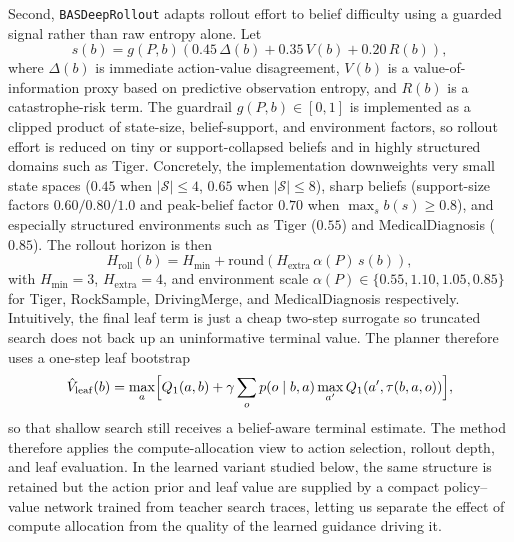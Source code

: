 \documentclass[10pt,twocolumn]{article}
\begin{document}
Second, \texttt{BASDeepRollout} adapts rollout effort to belief difficulty using a guarded signal rather than raw entropy alone. Let
\begin{equation}
s(b)=g(P,b)\left(0.45\,\Delta(b)+0.35\,V(b)+0.20\,R(b)\right),
\end{equation}
where $\Delta(b)$ is immediate action-value disagreement, $V(b)$ is a value-of-information proxy based on predictive observation entropy, and $R(b)$ is a catastrophe-risk term. The guardrail $g(P,b)\in[0,1]$ is implemented as a clipped product of state-size, belief-support, and environment factors, so rollout effort is reduced on tiny or support-collapsed beliefs and in highly structured domains such as Tiger. Concretely, the implementation downweights very small state spaces ($0.45$ when $|\mathcal{S}|\le 4$, $0.65$ when $|\mathcal{S}|\le 8$), sharp beliefs (support-size factors $0.60/0.80/1.0$ and peak-belief factor $0.70$ when $\max_s b(s)\ge 0.8$), and especially structured environments such as Tiger ($0.55$) and MedicalDiagnosis ($0.85$). The rollout horizon is then
\begin{equation}
H_{\mathrm{roll}}(b)=H_{\min}+\mathrm{round}\!\left(H_{\mathrm{extra}}\,\alpha(P)\,s(b)\right),
\end{equation}
with $H_{\min}=3$, $H_{\mathrm{extra}}=4$, and environment scale $\alpha(P)\in\{0.55,1.10,1.05,0.85\}$ for Tiger, RockSample, DrivingMerge, and MedicalDiagnosis respectively. Intuitively, the final leaf term is just a cheap two-step surrogate so truncated search does not back up an uninformative terminal value. The planner therefore uses a one-step leaf bootstrap
\begin{equation}
\hat V_{\mathrm{leaf}}(b)=
\max_a \Bigl[
Q_1(a,b)+\gamma \sum_o p(o\mid b,a)
\max_{a'} Q_1(a',\tau(b,a,o))
\Bigr],
\end{equation}
so that shallow search still receives a belief-aware terminal estimate. The method therefore applies the compute-allocation view to action selection, rollout depth, and leaf evaluation. In the learned variant studied below, the same structure is retained but the action prior and leaf value are supplied by a compact policy--value network trained from teacher search traces, letting us separate the effect of compute allocation from the quality of the learned guidance driving it.
\end{document}
